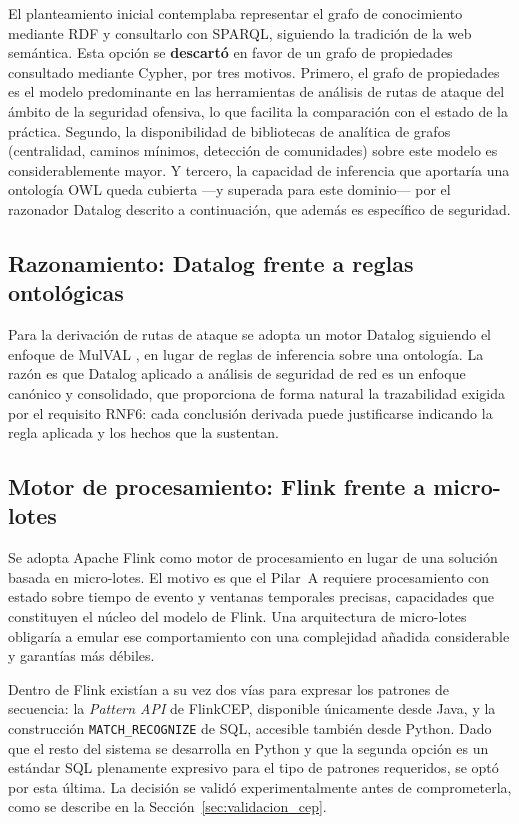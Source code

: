 El planteamiento inicial contemplaba representar el grafo de conocimiento mediante RDF y
consultarlo con SPARQL, siguiendo la tradición de la web semántica. Esta opción se
\textbf{descartó} en favor de un grafo de propiedades consultado mediante Cypher, por tres
motivos. Primero, el grafo de propiedades es el modelo predominante en las herramientas de
análisis de rutas de ataque del ámbito de la seguridad ofensiva, lo que facilita la
comparación con el estado de la práctica. Segundo, la disponibilidad de bibliotecas de
analítica de grafos (centralidad, caminos mínimos, detección de comunidades) sobre este
modelo es considerablemente mayor. Y tercero, la capacidad de inferencia que aportaría una
ontología OWL queda cubierta —y superada para este dominio— por el razonador Datalog descrito
a continuación, que además es específico de seguridad.

\subsection{Razonamiento: Datalog frente a reglas ontológicas}

Para la derivación de rutas de ataque se adopta un motor Datalog siguiendo el enfoque de
MulVAL \cite{mulval}, en lugar de reglas de inferencia sobre una ontología. La razón es que
Datalog aplicado a análisis de seguridad de red es un enfoque canónico y consolidado, que
proporciona de forma natural la trazabilidad exigida por el requisito RNF6: cada conclusión
derivada puede justificarse indicando la regla aplicada y los hechos que la sustentan.

\subsection{Motor de procesamiento: Flink frente a micro-lotes}

Se adopta Apache Flink como motor de procesamiento en lugar de una solución basada en
micro-lotes. El motivo es que el Pilar~A requiere procesamiento con estado sobre tiempo de
evento y ventanas temporales precisas, capacidades que constituyen el núcleo del modelo de
Flink. Una arquitectura de micro-lotes obligaría a emular ese comportamiento con una
complejidad añadida considerable y garantías más débiles.

Dentro de Flink existían a su vez dos vías para expresar los patrones de secuencia: la
\textit{Pattern API} de FlinkCEP, disponible únicamente desde Java, y la construcción
\texttt{MATCH\_RECOGNIZE} de SQL, accesible también desde Python. Dado que el resto del
sistema se desarrolla en Python y que la segunda opción es un estándar SQL plenamente
expresivo para el tipo de patrones requeridos, se optó por esta última. La decisión se
validó experimentalmente antes de comprometerla, como se describe en la
Sección~\ref{sec:validacion_cep}.

